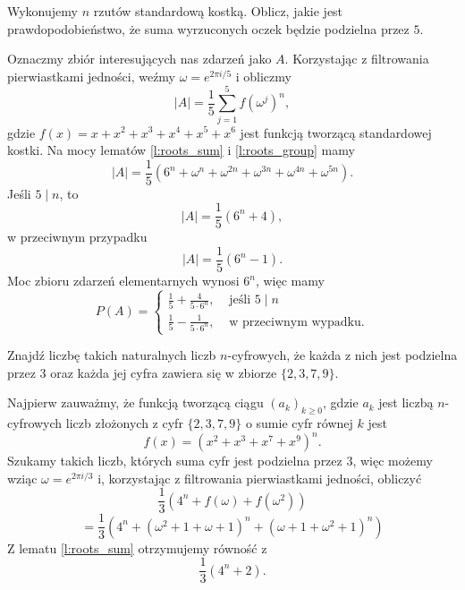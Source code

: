 \documentclass{scrartcl}
\begin{document}
    \begin{problem}[IMC 1999, B2]
        Wykonujemy $n$ rzutów standardową kostką. Oblicz, jakie jest prawdopodobieństwo, że suma wyrzuconych oczek będzie podzielna przez $5$.
        \begin{answer}
            Oznaczmy zbiór interesujących nas zdarzeń jako $A$. Korzystając z filtrowania pierwiastkami jedności, weźmy $\omega = e^{2\pi i / 5}$ i obliczmy
            $$ |A| = \frac{1}{5}\sum_{j = 1}^5 f(\omega^j)^n, $$
            gdzie $f(x) = x + x^2 + x^3 + x^4 + x^5 + x^6$ jest funkcją tworzącą standardowej kostki. Na mocy lematów \ref{l:roots_sum} i \ref{l:roots_group} mamy
            $$ |A| = \frac{1}{5}\left(6^n + \omega^n + \omega^{2n} + \omega^{3n} + \omega^{4n} + \omega^{5n}\right). $$
            Jeśli $5\mid n$, to
            $$ |A| = \frac{1}{5}\left(6^n + 4\right), $$
            w przeciwnym przypadku
            $$ |A| = \frac{1}{5}\left(6^n - 1\right). $$
            Moc zbioru zdarzeń elementarnych wynosi $6^n$, więc mamy
            $$ P(A) = \begin{cases}\frac{1}{5} + \frac{4}{5\cdot 6^n}, & \text{ jeśli } 5\mid n \\
                                   \frac{1}{5} - \frac{1}{5\cdot 6^n}, & \text{ w przeciwnym wypadku.} \end{cases} $$
        \end{answer}
    \end{problem}

    \begin{problem}
        Znajdź liczbę takich naturalnych liczb $n$-cyfrowych, że każda z nich jest podzielna przez $3$ oraz każda jej cyfra zawiera się w zbiorze $\{2, 3, 7, 9\}$.
        \begin{answer}
            Najpierw zauważmy, że funkcją tworzącą ciągu $(a_k)_{k\geq 0}$, gdzie $a_k$ jest liczbą $n$-cyfrowych liczb złożonych z cyfr $\{2, 3, 7, 9\}$ o sumie cyfr równej $k$ jest
            $$ f(x) = \left(x^2 + x^3 + x^7 + x^9\right)^n. $$
            Szukamy takich liczb, których suma cyfr jest podzielna przez $3$, więc możemy wziąc $\omega = e^{2\pi i / 3}$ i, korzystając z filtrowania pierwiastkami jedności, obliczyć
            $$ \frac{1}{3}\left(4^n + f(\omega) + f(\omega^2)\right) $$
            $$ = \frac{1}{3}\left(4^n + \left(\omega^2 + 1 + \omega + 1\right)^n + \left(\omega + 1 + \omega^2 + 1\right)^n\right) $$
            Z lematu \ref{l:roots_sum} otrzymujemy równość z
            $$ \frac{1}{3}\left(4^n + 2\right). $$
        \end{answer}
    \end{problem}
\end{document}
